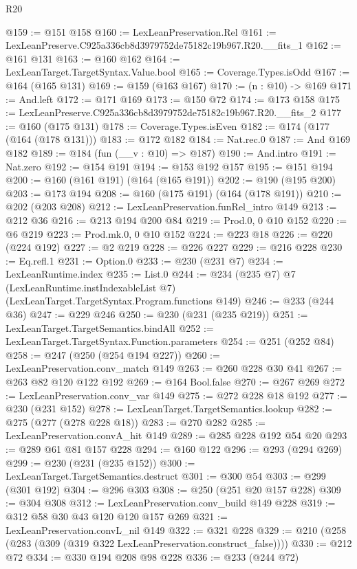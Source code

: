 \begin{lexlean}{R20}
\begin{coremodule}
@159 := @151 @158
@160 := LexLeanPreservation.Rel
@161 := LexLeanPreserve.C925a336cb8d3979752de75182c19b967.R20.__fits_1
@162 := @161 @131
@163 := @160 @162
@164 := LexLeanTarget.TargetSyntax.Value.bool
@165 := Coverage.Types.isOdd
@167 := @164 (@165 @131)
@169 := @159 (@163 @167)
@170 := (n : @10) -> @169
@171 := And.left
@172 := @171 @169
@173 := @150 @72
@174 := @173 @158
@175 := LexLeanPreserve.C925a336cb8d3979752de75182c19b967.R20.__fits_2
@177 := @160 (@175 @131)
@178 := Coverage.Types.isEven
@182 := @174 (@177 (@164 (@178 @131)))
@183 := @172 @182
@184 := Nat.rec.{0}
@187 := And @169 @182
@189 := @184 (fun (__v : @10) => @187)
@190 := And.intro
@191 := Nat.zero
@192 := @154 @191
@194 := @153 @192 @157
@195 := @151 @194
@200 := @160 (@161 @191) (@164 (@165 @191))
@202 := @190 (@195 @200)
@203 := @173 @194
@208 := @160 (@175 @191) (@164 (@178 @191))
@210 := @202 (@203 @208)
@212 := LexLeanPreservation.funRel_intro @149
@213 := @212 @36
@216 := @213 @194 @200 @84
@219 := Prod.{0, 0} @10 @152
@220 := @6 @219
@223 := Prod.mk.{0, 0} @10 @152
@224 := @223 @18
@226 := @220 (@224 @192)
@227 := @2 @219
@228 := @226 @227
@229 := @216 @228
@230 := Eq.refl.{1}
@231 := Option.{0}
@233 := @230 (@231 @7)
@234 := LexLeanRuntime.index
@235 := List.{0}
@244 := @234
    (@235 @7)
    @7
    (LexLeanRuntime.instIndexableList @7)
    (LexLeanTarget.TargetSyntax.Program.functions @149)
@246 := @233 (@244 @36)
@247 := @229 @246
@250 := @230 (@231 (@235 @219))
@251 := LexLeanTarget.TargetSemantics.bindAll
@252 := LexLeanTarget.TargetSyntax.Function.parameters
@254 := @251 (@252 @84)
@258 := @247 (@250 (@254 @194 @227))
@260 := LexLeanPreservation.conv_match @149
@263 := @260 @228 @30 @41
@267 := @263 @82 @120 @122 @192
@269 := @164 Bool.false
@270 := @267 @269
@272 := LexLeanPreservation.conv_var @149
@275 := @272 @228 @18 @192
@277 := @230 (@231 @152)
@278 := LexLeanTarget.TargetSemantics.lookup
@282 := @275 (@277 (@278 @228 @18))
@283 := @270 @282
@285 := LexLeanPreservation.convA_hit @149
@289 := @285 @228 @192 @54 @20
@293 := @289 @61 @81 @157 @228
@294 := @160 @122
@296 := @293 (@294 @269)
@299 := @230 (@231 (@235 @152))
@300 := LexLeanTarget.TargetSemantics.destruct
@301 := @300 @54
@303 := @299 (@301 @192)
@304 := @296 @303
@308 := @250 (@251 @20 @157 @228)
@309 := @304 @308
@312 := LexLeanPreservation.conv_build @149 @228
@319 := @312 @58 @30 @43 @120 @120 @157 @269
@321 := LexLeanPreservation.convL_nil @149
@322 := @321 @228
@329 := @210 (@258 (@283 (@309 (@319 @322 LexLeanPreservation.construct_false))))
@330 := @212 @72
@334 := @330 @194 @208 @98 @228
@336 := @233 (@244 @72)

\end{coremodule}
\end{lexlean}
